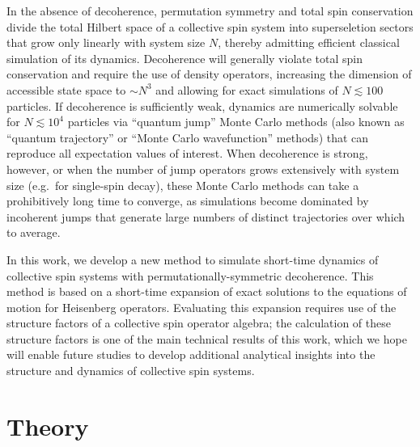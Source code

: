 \documentclass[aps,11pt,notitlepage,nofootinbib,longbibliography]{revtex4-1}
\newcommand{\1}{\mathds{1}}
\begin{document}
In the absence of decoherence, permutation symmetry and total spin
conservation divide the total Hilbert space of a collective spin
system into superseletion sectors that grow only linearly with system
size $N$, thereby admitting efficient classical simulation of its
dynamics.  Decoherence will generally violate total spin conservation
and require the use of density operators, increasing the dimension of
accessible state space to $\sim N^3$\cite{hartmann2016generalized,
  xu2013simulating} and allowing for exact simulations of
$N\lesssim100$ particles.  If decoherence is sufficiently weak,
dynamics are numerically solvable for $N\lesssim10^4$ particles via
``quantum jump'' Monte Carlo methods\cite{plenio1998quantumjump,
  zhang2018montecarlo} (also known as ``quantum trajectory'' or
``Monte Carlo wavefunction'' methods) that can reproduce all
expectation values of interest.  When decoherence is strong, however,
or when the number of jump operators grows extensively with system
size (e.g.~for single-spin decay), these Monte Carlo methods can take
a prohibitively long time to converge, as simulations become dominated
by incoherent jumps that generate large numbers of distinct
trajectories over which to average.

In this work, we develop a new method to simulate short-time dynamics
of collective spin systems with permutationally-symmetric decoherence.
This method is based on a short-time expansion of exact solutions to
the equations of motion for Heisenberg operators.  Evaluating this
expansion requires use of the structure factors of a collective spin
operator algebra; the calculation of these structure factors is one of
the main technical results of this work, which we hope will enable
future studies to develop additional analytical insights into the
structure and dynamics of collective spin systems.


\section{Theory}
\end{document}
